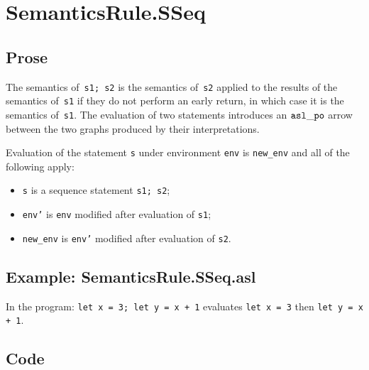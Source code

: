 \documentclass{book}
\begin{document}

\section{SemanticsRule.SSeq \label{sec:SemanticsRule.SSeq}}
  \subsection{Prose}
  The semantics of~\texttt{s1; s2} is the semantics of~\texttt{s2} applied to the results
  of the semantics of~\texttt{s1} if they do not perform an early return, in which
  case it is the semantics of~\texttt{s1}.
  The evaluation of two statements introduces an $\mathtt{asl\_po}$ arrow between the two
  graphs produced by their interpretations.

  Evaluation of the statement \texttt{s} under environment \texttt{env} is
\texttt{new\_env} and all of the following apply:
  \begin{itemize}
  \item \texttt{s} is a sequence statement \texttt{s1; s2};
  \item \texttt{env'} is \texttt{env} modified after evaluation of \texttt{s1};
  \item \texttt{new\_env} is \texttt{env'} modified after evaluation of \texttt{s2}.
  \end{itemize}

  \subsection{Example: SemanticsRule.SSeq.asl}
  In the program:
  \texttt{let x = 3; let y = x + 1} evaluates \texttt{let x = 3} then \texttt{let y = x + 1}.

  \subsection{Code}
\end{document}
